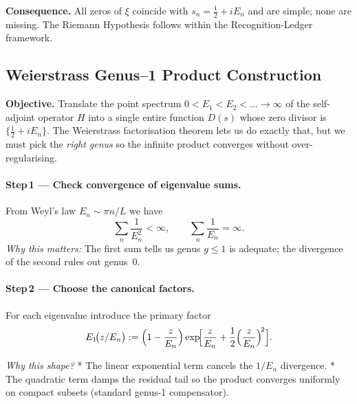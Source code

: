 \documentclass[11pt]{article}
\begin{document}
\begin{flushright}\qedsymbol\end{flushright}

\bigskip
\textbf{Consequence.}\;
All zeros of \(\xi\) coincide with
\(s_n=\tfrac12+iE_n\) and are simple; none are missing.
The Riemann Hypothesis follows within the
Recognition-Ledger framework.


\subsection{Weierstrass Genus–1 Product Construction}
\label{sec:FredholmConstruct}

\noindent
\textbf{Objective.}\;
Translate the point spectrum
\(
   0<E_{1}<E_{2}<\dots\to\infty
\)
of the self-adjoint operator \(H\) into a single entire function
\(D(s)\) whose zero divisor is
\(\{\tfrac12+iE_{n}\}\).
The Weierstrass factorisation theorem lets us do exactly that, but we
must pick the \emph{right genus} so the infinite product converges
without over-regularising.

\vspace{0.6em}
\paragraph{Step\,1 — Check convergence of eigenvalue sums.}

From Weyl’s law \(E_{n}\sim\pi n/L\) we have
\[
   \sum_{n}\frac1{E_{n}^{2}}<\infty,
   \qquad
   \sum_{n}\frac1{E_{n}}=\infty.
\]
\emph{Why this matters:}  
The first sum tells us genus $g\le1$ is adequate;
the divergence of the second rules out genus~0.

\vspace{0.4em}
\paragraph{Step\,2 — Choose the canonical factors.}

For each eigenvalue introduce the primary factor
\[
   E_{1}\!\bigl(z/E_{n}\bigr)
   :=\Bigl(1-\frac{z}{E_{n}}\Bigr)
     \exp\!\Bigl[\frac{z}{E_{n}}+\frac12\Bigl(\frac{z}{E_{n}}\Bigr)^{\!2}\Bigr].
\]

\emph{Why this shape?}  
* The linear exponential term cancels the $1/E_{n}$ divergence.  
* The quadratic term damps the residual tail so the product converges
  uniformly on compact subsets (standard genus-1 compensator).
\end{document}

